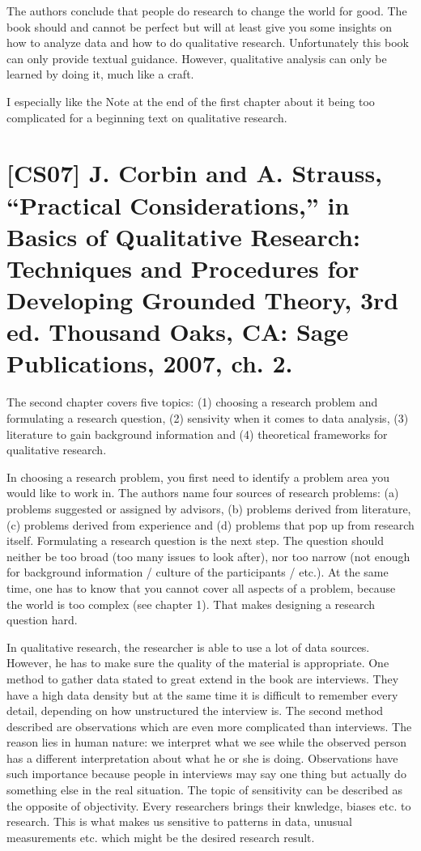 \documentclass[a4paper,12pt,english]{scrartcl}
\newcommand{\papertitle}[2]{
	\section{[#1] #2}
}
\begin{document}
The authors conclude that people do research to change the world for good. The book should and cannot be perfect but will at least give you some insights on how to analyze data and how to do qualitative research. Unfortunately this book can only provide textual guidance. However, qualitative analysis can only be learned by doing it, much like a craft.

{\tiny I especially like the Note at the end of the first chapter about it being too complicated for a beginning text on qualitative research.}

\newpage

\papertitle{CS07}{J. Corbin and A. Strauss, \enquote{Practical Considerations,} in Basics of Qualitative Research: Techniques and Procedures for Developing Grounded Theory, 3rd ed. Thousand Oaks, CA: Sage Publications, 2007, ch. 2.}

The second chapter covers five topics: (1) choosing a research problem and formulating a research question, (2) sensivity when it comes to data analysis, (3) literature to gain background information and (4) theoretical frameworks for qualitative research.

In choosing a research problem, you first need to identify a problem area you would like to work in. The authors name four sources of research problems: (a) problems suggested or assigned by advisors, (b) problems derived from literature, (c) problems derived from experience and (d) problems that pop up from research itself. Formulating a research question is the next step. The question should neither be too broad (too many issues to look after), nor too narrow (not enough for background information / culture of the participants / etc.). At the same time, one has to know that you cannot cover all aspects of a problem, because the world is too complex (see chapter 1). That makes designing a research question hard.

In qualitative research, the researcher is able to use a lot of data sources. However, he has to make sure the quality of the material is appropriate. One method to gather data stated to great extend in the book are interviews. They have a high data density but at the same time it is difficult to remember every detail, depending on how unstructured the interview is. The second method described are observations which are even more complicated than interviews. The reason lies in human nature: we interpret what we see while the observed person has a different interpretation about what he or she is doing. Observations have such importance because people in interviews may say one thing but actually do something else in the real situation. The topic of sensitivity can be described as the opposite of objectivity. Every researchers brings their knwledge, biases etc. to research. This is what makes us sensitive to patterns in data, unusual measurements etc. which might be the desired research result.
\end{document}
